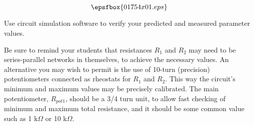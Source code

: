 

$$\epsfbox{01754x01.eps}$$

\vfil \eject






Use circuit simulation software to verify your predicted and measured parameter values.







Be sure to remind your students that resistances $R_1$ and $R_2$ may need to be series-parallel networks in themselves, to achieve the necessary values.  An alternative you may wish to permit is the use of 10-turn (precision) potentiometers connected as rheostats for $R_1$ and $R_2$.  This way the circuit's minimum and maximum values may be precisely calibrated.  The main potentiometer, $R_{pot1}$, should be a 3/4 turn unit, to allow fast checking of minimum and maximum total resistance, and it should be some common value such as 1 k$\Omega$ or 10 k$\Omega$.




